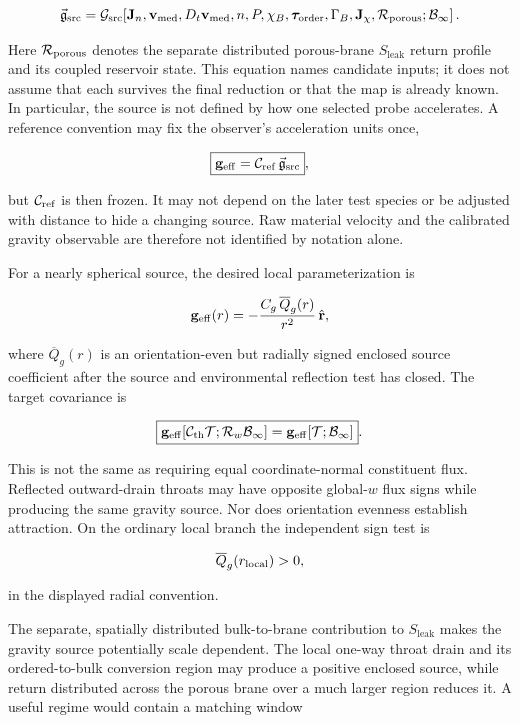 \[
\vec{\mathfrak{g}}_{\rm src}
=
\mathcal G_{\rm src}
\!\left[
\mathbf J_n,\mathbf v_{\rm med},D_t\mathbf v_{\rm med},
n,P,\chi_B,\bm{\tau}_{\rm order},
\Gamma_B,\mathbf J_\chi,\mathcal R_{\rm porous};\mathcal B_\infty
\right].
\]

Here \(\mathcal R_{\rm porous}\) denotes the separate distributed porous-brane
\(S_{\mathrm{leak}}\) return profile and its coupled reservoir state. This
equation names candidate inputs; it does not assume that each survives the final
reduction or that the map is already known. In particular, the source is not
defined by how one selected probe accelerates. A reference convention may fix
the observer's acceleration units once,

\[
\boxed{
\mathbf g_{\rm eff}
=
\mathcal C_{\rm ref}\,
\vec{\mathfrak{g}}_{\rm src}
},
\]

but \(\mathcal C_{\rm ref}\) is then frozen. It may not depend on the later test
species or be adjusted with distance to hide a changing source. Raw material
velocity and the calibrated gravity observable are therefore not identified by
notation alone.

For a nearly spherical source, the desired local parameterization is

\[
\mathbf g_{\rm eff}(r)
=
-\frac{C_g\,\overline Q_g(r)}{r^2}\,\hat{\mathbf r},
\]

where \(\overline Q_g(r)\) is an orientation-even but radially signed enclosed
source coefficient after the source and environmental reflection test has
closed. The target covariance is

\[
\boxed{
\mathbf g_{\rm eff}
[\mathcal C_{\rm th}\mathcal T;
 \mathcal R_w\mathcal B_\infty]
=
\mathbf g_{\rm eff}
[\mathcal T;\mathcal B_\infty]
}.
\]

This is not the same as requiring equal coordinate-normal constituent flux.
Reflected outward-drain throats may have opposite global-\(w\) flux signs while
producing the same gravity source. Nor does orientation evenness establish
attraction. On the ordinary local branch the independent sign test is

\[
\overline Q_g(r_{\rm local})>0,
\]

in the displayed radial convention.

The separate, spatially distributed bulk-to-brane contribution to
\(S_{\mathrm{leak}}\) makes the gravity source potentially scale dependent. The
local one-way throat drain and its ordered-to-bulk conversion region may produce
a positive enclosed source, while return distributed across the porous brane
over a much larger region reduces it. A useful regime would
contain a matching window

